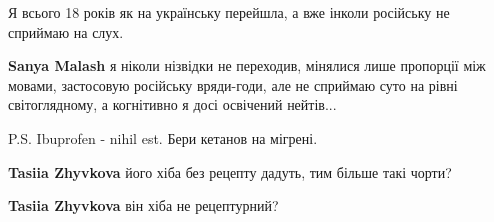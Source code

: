 \begin{itemize}
 

Я всього 18 років як на українську перейшла, а вже інколи російську не сприймаю
на слух.

\begin{itemize}
 
\textbf{Sanya Malash} я ніколи нізвідки не переходив, мінялися лише пропорції
між мовами, застосовую російську вряди-годи, але не сприймаю суто на рівні
світоглядному, а когнітивно я досі освічений нейтів...
\end{itemize}

 
P.S. Ibuprofen - nihil est. Бери кетанов на мігрені.

\begin{itemize}
 
\textbf{Tasiia Zhyvkova} його хіба без рецепту дадуть, тим більше такі чорти?

 
\textbf{Tasiia Zhyvkova} він хіба не рецептурний?


 

\end{itemize}
\end{itemize}
